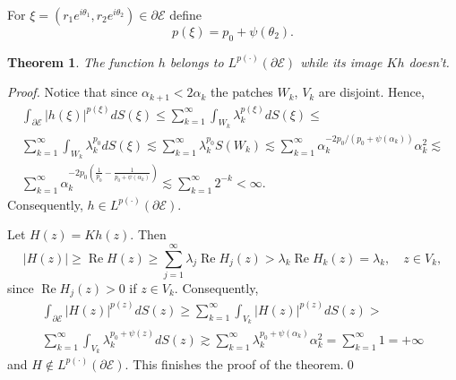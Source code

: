\documentclass[review]{elsarticle}
\newtheorem{thm}{Theorem}%
\newcommand{\abs}[1]{\left\vert #1 \right\vert}
\newcommand{\RE}{ \mathop{\mathrm{Re}} }
\newcommand{\Cn}{ \mathbb{C}^n }
\newcommand{\Lp} { L^{p(\cdot)}(\partial\mathcal{E})}
\begin{document}
For $\xi=\left(r_1e^{i\theta_1},r_2e^{i\theta_2}\right)\in\partial\mathcal{E}$ define 
$$ p(\xi) = p_0+\psi(\theta_2).$$

\begin{thm}
	The function $h$ belongs to $\Lp$ while its image $Kh$ doesn't.
\end{thm}

\begin{proof}
	Notice that since $\alpha_{k+1}<2\alpha_k$ the patches $W_k$, $V_k$ are disjoint. Hence,
	\begin{multline*}
	\int_{\partial\mathcal{E}} \abs{h(\xi)}^{p(\xi)} dS(\xi) \leq
	\sum\limits_{k=1}^\infty \int_{W_k}	\lambda_k^{p(\xi)} dS(\xi) \leq\\ \sum\limits_{k=1}^\infty \int_{W_k}	\lambda_k^{p_0} dS(\xi) \lesssim 
	\sum\limits_{k=1}^\infty \lambda_k^{p_0} S(W_k)\lesssim \sum\limits_{k=1}^\infty \alpha_k^{- 2p_0/(p_0+\psi(\alpha_k))}  \alpha_{k}^{2} \lesssim\\ \sum\limits_{k=1}^\infty \alpha_k^{-2{p_0}\left( \frac{1}{p_0}-\frac{1}{p_0+\psi(\alpha_k)} \right)}\lesssim 
	\sum\limits_{k=1}^\infty 2^{- k}<\infty.
	\end{multline*}
	Consequently, $h\in \Lp.$
	
	Let $H(z)=Kh(z).$ Then 
	$$\abs{H(z)}\geq \RE{H(z)} \geq \sum\limits_{j = 1}^\infty \lambda_j \RE{H_j(z)} > \lambda_k \RE{H_k(z)} = \lambda_k ,\quad z\in V_k,$$
	since $\RE{H_j(z)}>0$ if $z\in V_k$. Consequently, 
	\begin{multline*}
		\int_{\partial\mathcal{E}} \abs{H(z)}^{p(z)} dS(z) \geq 
		\sum\limits_{k=1}^\infty \int_{V_k} \abs{H(z)}^{p(z)} dS(z)>\\
		\sum\limits_{k=1}^\infty \int_{V_k} \lambda_k^{p_0+\psi(z)} dS(z)\gtrsim \sum\limits_{k=1}^\infty \lambda_k^{p_0+\psi(\alpha_k)}\alpha_k^2 =\sum\limits_{k=1}^\infty  1 =+ \infty
	\end{multline*} 
	and $H\not\in \Lp.$ This finishes the proof of the theorem.\qed
\end{proof}


%
\end{document}
